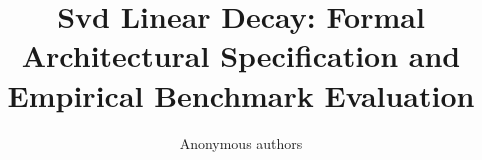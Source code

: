 \title{\textbf{Svd Linear Decay: Formal Architectural Specification and Empirical Benchmark Evaluation}}

\author{Anonymous authors}
